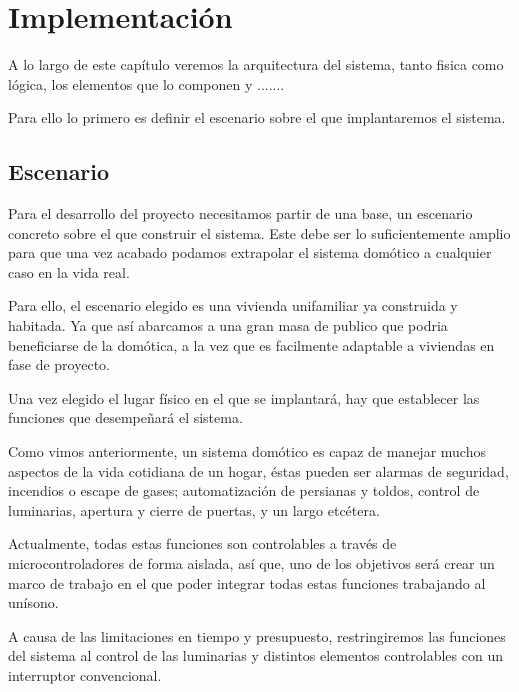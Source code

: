 \chapter{Implementación}
 A lo largo de este capítulo veremos  la arquitectura del sistema, tanto fisica como lógica, los elementos que lo componen y ....... 

Para ello lo primero es definir el escenario sobre el que implantaremos el sistema.

\section{Escenario}
Para el desarrollo del proyecto necesitamos partir de una base, un escenario concreto sobre el que construir el sistema. Este debe ser lo suficientemente amplio para que una vez acabado podamos extrapolar el sistema domótico a cualquier caso en la vida real.

Para ello, el escenario elegido es una vivienda unifamiliar ya construida y habitada. Ya que así abarcamos a una gran masa de publico que podria beneficiarse de la domótica, a la vez que es facilmente adaptable a viviendas en fase de proyecto.

Una vez elegido el lugar físico en el que se implantará, hay que establecer las funciones que desempeñará el sistema. 

Como vimos anteriormente, un sistema domótico es capaz de manejar muchos aspectos de la vida cotidiana de un hogar, éstas pueden ser alarmas de seguridad, incendios o escape de gases; automatización de persianas y toldos, control de luminarias, apertura y cierre de puertas, y un largo etcétera. 

Actualmente, todas estas funciones son controlables a través de microcontroladores de forma aislada, así que, uno de los objetivos será crear un marco de trabajo en el que poder integrar todas estas funciones trabajando al unísono.

A causa de las limitaciones en tiempo y presupuesto, restringiremos las funciones del sistema al control de las luminarias y                     distintos elementos controlables con un interruptor convencional. 

